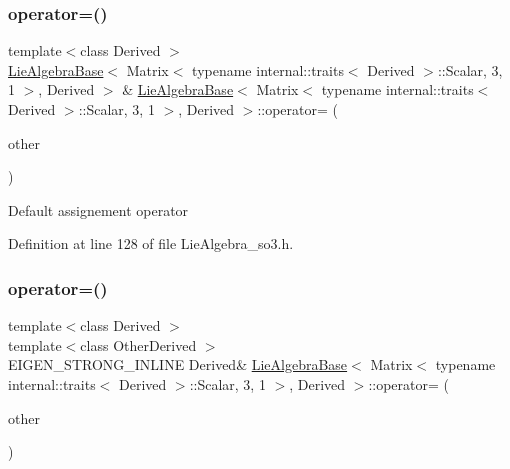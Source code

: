 \subsubsection{\texorpdfstring{operator=()}{operator=()}\hspace{0.1cm}{\footnotesize\ttfamily [1/4]}}
{\footnotesize\ttfamily template$<$class Derived $>$ \\
\hyperlink{class_lie_algebra_base}{Lie\+Algebra\+Base}$<$ Matrix$<$ typename internal\+::traits$<$ Derived $>$\+::Scalar, 3, 1 $>$, Derived $>$ \& \hyperlink{class_lie_algebra_base}{Lie\+Algebra\+Base}$<$ Matrix$<$ typename internal\+::traits$<$ Derived $>$\+::Scalar, 3, 1 $>$, Derived $>$\+::operator= (\begin{DoxyParamCaption}\item[{const \hyperlink{class_lie_algebra_base}{Lie\+Algebra\+Base}$<$ Matrix$<$ typename internal\+::traits$<$ Derived $>$\+::Scalar, 3, 1 $>$, Derived $>$ \&}]{other }\end{DoxyParamCaption})\hspace{0.3cm}{\ttfamily [inline]}}

Default assignement operator 

Definition at line 128 of file Lie\+Algebra\+\_\+so3.\+h.

\hypertarget{class_lie_algebra_base_3_01_matrix_3_01typename_01internal_1_1traits_3_01_derived_01_4_1_1_scalabfa0bdce6d9781ee940346c3f6d91f4e_a04876d813c2cd5c25150f4028ba048ca}{}\label{class_lie_algebra_base_3_01_matrix_3_01typename_01internal_1_1traits_3_01_derived_01_4_1_1_scalabfa0bdce6d9781ee940346c3f6d91f4e_a04876d813c2cd5c25150f4028ba048ca} 
\subsubsection{\texorpdfstring{operator=()}{operator=()}\hspace{0.1cm}{\footnotesize\ttfamily [2/4]}}
{\footnotesize\ttfamily template$<$class Derived $>$ \\
template$<$class Other\+Derived $>$ \\
E\+I\+G\+E\+N\+\_\+\+S\+T\+R\+O\+N\+G\+\_\+\+I\+N\+L\+I\+NE Derived\& \hyperlink{class_lie_algebra_base}{Lie\+Algebra\+Base}$<$ Matrix$<$ typename internal\+::traits$<$ Derived $>$\+::Scalar, 3, 1 $>$, Derived $>$\+::operator= (\begin{DoxyParamCaption}\item[{const \hyperlink{class_lie_algebra_base}{Lie\+Algebra\+Base}$<$ \hyperlink{class_lie_algebra_base_3_01_matrix_3_01typename_01internal_1_1traits_3_01_derived_01_4_1_1_scalabfa0bdce6d9781ee940346c3f6d91f4e_a2191d421225a2c966825db324301abba}{Base\+Type}, Other\+Derived $>$ \&}]{other }\end{DoxyParamCaption})}

